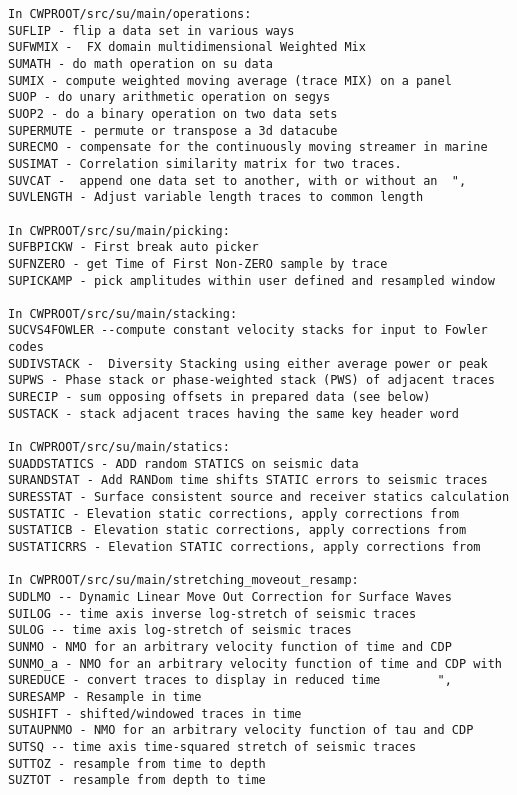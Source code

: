 {{\begin{verbatim}
In CWPROOT/src/su/main/operations:
SUFLIP - flip a data set in various ways			
SUFWMIX -  FX domain multidimensional Weighted Mix			
SUMATH - do math operation on su data 		
SUMIX - compute weighted moving average (trace MIX) on a panel	
SUOP - do unary arithmetic operation on segys 		
SUOP2 - do a binary operation on two data sets			
SUPERMUTE - permute or transpose a 3d datacube	 		
SURECMO - compensate for the continuously moving streamer in marine   
SUSIMAT - Correlation similarity matrix for two traces.		
SUVCAT -  append one data set to another, with or without an  ", 
SUVLENGTH - Adjust variable length traces to common length   	

In CWPROOT/src/su/main/picking:
SUFBPICKW - First break auto picker				
SUFNZERO - get Time of First Non-ZERO sample by trace              
SUPICKAMP - pick amplitudes within user defined and resampled window	

In CWPROOT/src/su/main/stacking:
SUCVS4FOWLER --compute constant velocity stacks for input to Fowler codes
SUDIVSTACK -  Diversity Stacking using either average power or peak   
SUPWS - Phase stack or phase-weighted stack (PWS) of adjacent traces	
SURECIP - sum opposing offsets in prepared data (see below)	
SUSTACK - stack adjacent traces having the same key header word

In CWPROOT/src/su/main/statics:
SUADDSTATICS - ADD random STATICS on seismic data			
SURANDSTAT - Add RANDom time shifts STATIC errors to seismic traces	
SURESSTAT - Surface consistent source and receiver statics calculation
SUSTATIC - Elevation static corrections, apply corrections from	
SUSTATICB - Elevation static corrections, apply corrections from	
SUSTATICRRS - Elevation STATIC corrections, apply corrections from	

In CWPROOT/src/su/main/stretching_moveout_resamp:
SUDLMO -- Dynamic Linear Move Out Correction for Surface Waves  	
SUILOG -- time axis inverse log-stretch of seismic traces	
SULOG -- time axis log-stretch of seismic traces		
SUNMO - NMO for an arbitrary velocity function of time and CDP	     
SUNMO_a - NMO for an arbitrary velocity function of time and CDP with	     
SUREDUCE - convert traces to display in reduced time		", 
SURESAMP - Resample in time                                       
SUSHIFT - shifted/windowed traces in time				
SUTAUPNMO - NMO for an arbitrary velocity function of tau and CDP	
SUTSQ -- time axis time-squared stretch of seismic traces	
SUTTOZ - resample from time to depth					
SUZTOT - resample from depth to time					


\end{verbatim}}}
